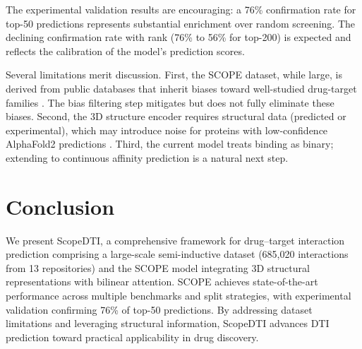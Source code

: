 \documentclass[11pt]{article}
\begin{document}
The experimental validation results are encouraging: a 76\% confirmation rate for top-50 predictions represents substantial enrichment over random screening. The declining confirmation rate with rank (76\% to 56\% for top-200) is expected and reflects the calibration of the model's prediction scores.

Several limitations merit discussion. First, the SCOPE dataset, while large, is derived from public databases that inherit biases toward well-studied drug-target families \citep{bagherian2021}. The bias filtering step mitigates but does not fully eliminate these biases. Second, the 3D structure encoder requires structural data (predicted or experimental), which may introduce noise for proteins with low-confidence AlphaFold2 predictions \citep{jumper2021}. Third, the current model treats binding as binary; extending to continuous affinity prediction is a natural next step.

\section{Conclusion}

We present ScopeDTI, a comprehensive framework for drug--target interaction prediction comprising a large-scale semi-inductive dataset (685,020 interactions from 13 repositories) and the SCOPE model integrating 3D structural representations with bilinear attention. SCOPE achieves state-of-the-art performance across multiple benchmarks and split strategies, with experimental validation confirming 76\% of top-50 predictions. By addressing dataset limitations and leveraging structural information, ScopeDTI advances DTI prediction toward practical applicability in drug discovery.



\end{document}
